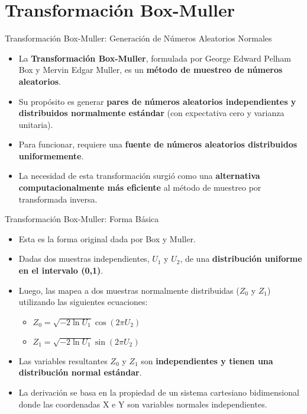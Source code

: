 \documentclass{beamer}
\begin{document}
\section{Transformación Box-Muller}

\begin{frame}{Transformación Box-Muller: Generación de Números Aleatorios Normales}
    \begin{itemize}
        \item La \textbf{Transformación Box-Muller}, formulada por George Edward Pelham Box y Mervin Edgar Muller, es un \textbf{método de muestreo de números aleatorios}.
        \item Su propósito es generar \textbf{pares de números aleatorios independientes y distribuidos normalmente estándar} (con expectativa cero y varianza unitaria).
        \item Para funcionar, requiere una \textbf{fuente de números aleatorios distribuidos uniformemente}.
        \item La necesidad de esta transformación surgió como una \textbf{alternativa computacionalmente más eficiente} al método de muestreo por transformada inversa.
    \end{itemize}
\end{frame}

\begin{frame}{Transformación Box-Muller: Forma Básica}
    \begin{itemize}
        \item Esta es la forma original dada por Box y Muller.
        \item Dadas dos muestras independientes, $U_1$ y $U_2$, de una \textbf{distribución uniforme en el intervalo (0,1)}.
        \item Luego, las mapea a dos muestras normalmente distribuidas ($Z_0$ y $Z_1$) utilizando las siguientes ecuaciones:
            \begin{itemize}
                \item $Z_0 = \sqrt{-2\ln U_1}\cos(2\pi U_2)$
                \item $Z_1 = \sqrt{-2\ln U_1}\sin(2\pi U_2)$
            \end{itemize}
        \item Las variables resultantes $Z_0$ y $Z_1$ son \textbf{independientes y tienen una distribución normal estándar}.
        \item La derivación se basa en la propiedad de un sistema cartesiano bidimensional donde las coordenadas X e Y son variables normales independientes.
    \end{itemize}
\end{frame}
\end{document}
